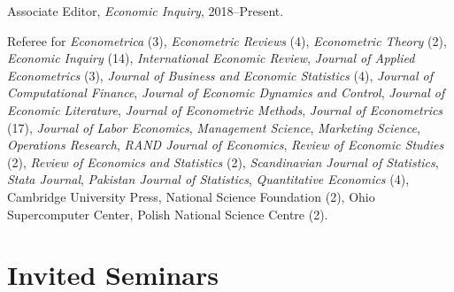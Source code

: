 \documentclass[10pt,letterpaper]{article}
\renewenvironment{itemize}{
  \begin{list}{}{
      \setlength{\leftmargin}{1.5em}
      \setlength{\itemsep}{0.25em}
      \setlength{\parskip}{0pt}
      \setlength{\parsep}{0.25em}
    }
}{
  \end{list}
}
\begin{document}
\begin{itemize}
\item Associate Editor, \textit{Economic Inquiry}, 2018--Present.
\item Referee for
\textit{Econometrica} (3),
\textit{Econometric Reviews} (4),
\textit{Econometric Theory} (2),
\textit{Economic Inquiry} (14),
\textit{International Economic Review},
\textit{Journal of Applied Econometrics} (3),
\textit{Journal of Business and Economic Statistics} (4),
\textit{Journal of Computational Finance},
\textit{Journal of Economic Dynamics and Control},
\textit{Journal of Economic Literature},
\textit{Journal of Econometric Methods},
\textit{Journal of Econometrics} (17),
\textit{Journal of Labor Economics},
\textit{Management Science},
\textit{Marketing Science},
\textit{Operations Research},
\textit{RAND Journal of Economics},
\textit{Review of Economic Studies} (2),
\textit{Review of Economics and Statistics} (2),
\textit{Scandinavian Journal of Statistics},
\textit{Stata Journal},
\textit{Pakistan Journal of Statistics},
\textit{Quantitative Economics} (4),
Cambridge University Press,
National Science Foundation (2),
Ohio Supercomputer Center,
Polish National Science Centre (2).
\end{itemize}

\section*{Invited Seminars}
\end{document}
